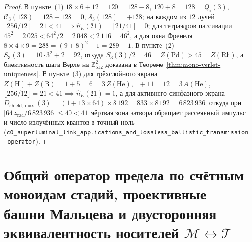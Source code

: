 \begin{proof}
В пункте~(1) $18\times 6 + 12 = 120 = 128 - 8$, $120 + 8 = 128 = Q_\square(3)$, $\mathcal{C}_3(128) = 128 - 128 = 0$, $\mathcal{S}_3(128) = +128$; на каждом из $12$ лучей $\lfloor 256/12 \rfloor = 21 < 41 \implies \hat{n}_E(21) = \lfloor 21/41 \rfloor = 0$; для тетраэдров пассивации $45^2 = 2\,025 < 64^2/2 = 2\,048 < 2\,116 = 46^2$, а для окна Френеля $8\times 4\times 9 = 288 = (9+8)^2 - 1 = 289 - 1$. В пункте~(2) $S_3(3) = 10\cdot 3^2 + 2 = 92$, откуда $S_3(3)/2 = 46 = Z(\mathrm{Pd}) > 45 = Z(\mathrm{Rh})$, а биективность шага Верле на $\mathbb{Z}_{512}^2$ доказана в Теореме~\ref{thm:mono-verlet-uniqueness}. В пункте~(3) для трёхслойного экрана $Z(\mathrm{H}) + Z(\mathrm{B}) = 1 + 5 = 6 = 3\,Z(\mathrm{He})$, $1 + 11 = 12 = 3\,A(\mathrm{He})$, $\lfloor 256/12 \rfloor = 21 < 41 \implies \hat{n}_E(21) = 0$, а для активного синфазного экрана $D_{\mathrm{shield,\max}}(3) = (1 + 13\times 64)\times 8\,192 = 833\times 8\,192 = 6\,823\,936$, откуда при $|64\,z_{\mathrm{rad}} / 6\,823\,936| \le 40 < 41$ мёртвая зона затвора обращает рассеянный импульс и число излучённых квантов в точный ноль (\texttt{c0\_superluminal\_link\_applications\_and\_lossless\_ballistic\_transmission\_operator}).
\end{proof}

\section{Общий оператор предела по счётным моноидам стадий, проективные башни Мальцева и двусторонняя эквивалентность носителей \texorpdfstring{$\mathcal{M} \leftrightarrow \mathcal{T}$}{M <-> T}}

